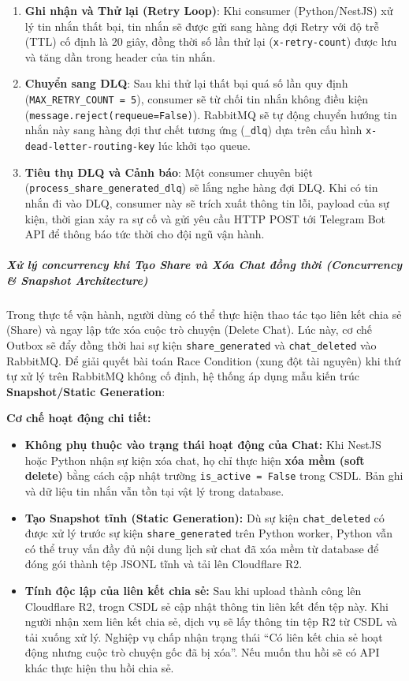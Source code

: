 \begin{enumerate}
\item \textbf{Ghi nhận và Thử lại (Retry Loop)}: Khi consumer (Python/NestJS) xử lý tin nhắn thất bại, tin nhắn sẽ được gửi sang hàng đợi Retry với độ trễ (TTL) cố định là 20 giây, đồng thời số lần thử lại (\texttt{x-retry-count}) được lưu và tăng dần trong header của tin nhắn.
\item \textbf{Chuyển sang DLQ}: Sau khi thử lại thất bại quá số lần quy định (\texttt{MAX\_RETRY\_COUNT = 5}), consumer sẽ từ chối tin nhắn không điều kiện (\texttt{message.reject(requeue=False)}). RabbitMQ sẽ tự động chuyển hướng tin nhắn này sang hàng đợi thư chết tương ứng (\texttt{\_dlq}) dựa trên cấu hình \texttt{x-dead-letter-routing-key} lúc khởi tạo queue.
\item \textbf{Tiêu thụ DLQ và Cảnh báo}: Một consumer chuyên biệt (\texttt{process\_share\_generated\_dlq}) sẽ lắng nghe hàng đợi DLQ. Khi có tin nhắn đi vào DLQ, consumer này sẽ trích xuất thông tin lỗi, payload của sự kiện, thời gian xảy ra sự cố và gửi yêu cầu HTTP POST tới Telegram Bot API để thông báo tức thời cho đội ngũ vận hành.
\end{enumerate}

\subparagraph{Xử lý concurrency khi Tạo Share và Xóa Chat đồng thời (Concurrency \& Snapshot Architecture)}

Trong thực tế vận hành, người dùng có thể thực hiện thao tác tạo liên kết chia sẻ (Share) và ngay lập tức xóa cuộc trò chuyện (Delete Chat). Lúc này, cơ chế Outbox sẽ đẩy đồng thời hai sự kiện \texttt{share\_generated} và \texttt{chat\_deleted} vào RabbitMQ. Để giải quyết bài toán Race Condition (xung đột tài nguyên) khi thứ tự xử lý trên RabbitMQ không cố định, hệ thống áp dụng mẫu kiến trúc \textbf{Snapshot/Static Generation}:

\textbf{Cơ chế hoạt động chi tiết:}
\begin{itemize}
\item \textbf{Không phụ thuộc vào trạng thái hoạt động của Chat:} Khi NestJS hoặc Python nhận sự kiện xóa chat, họ chỉ thực hiện \textbf{xóa mềm (soft delete)} bằng cách cập nhật trường \texttt{is\_active = False} trong CSDL. Bản ghi và dữ liệu tin nhắn vẫn tồn tại vật lý trong database.
\item \textbf{Tạo Snapshot tĩnh (Static Generation):} Dù sự kiện \texttt{chat\_deleted} có được xử lý trước sự kiện \texttt{share\_generated} trên Python worker, Python vẫn có thể truy vấn đầy đủ nội dung lịch sử chat đã xóa mềm từ database để đóng gói thành tệp JSONL tĩnh và tải lên Cloudflare R2.
\item \textbf{Tính độc lập của liên kết chia sẻ:}
Sau khi upload thành công lên Cloudflare R2,
trogn CSDL sẻ cập nhật thông tin liên kết đến tệp này.
Khi người nhận xem liên kết chia sẻ,
dịch vụ sẽ lấy thông tin tệp R2 từ CSDL và tải xuống xử lý.
Nghiệp vụ chấp nhận trạng thái
\enquote{Có liên kết chia sẻ hoạt động nhưng cuộc trò chuyện gốc đã bị xóa}.
Nếu muốn thu hồi sẽ có API khác thực hiện thu hồi chia sẻ.
\end{itemize}

